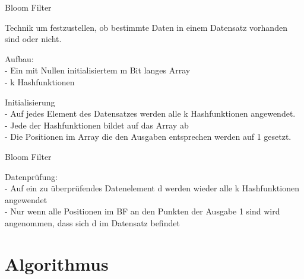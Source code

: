 \documentclass{beamer}
\begin{document}
	\begin{frame}{Bloom Filter}
		
		\begin{arrowlist}
			\item Technik um festzustellen, ob bestimmte Daten in einem Datensatz vorhanden sind oder nicht.
			\item  Aufbau:\\
			- Ein mit Nullen initialisiertem m Bit langes Array \\ 
			- k Hashfunktionen\\
			\item Initialisierung\\
			- Auf jedes Element des Datensatzes werden alle k Hashfunktionen angewendet.\\ 
			- Jede der Hashfunktionen bildet auf das Array ab\\
			- Die Positionen im Array die den Ausgaben entsprechen werden auf 1 gesetzt.\\
			
		\end{arrowlist}
		
	\end{frame}
	\begin{frame}{Bloom Filter}
		\begin{arrowlist}
			
			\item Datenprüfung:\\
			- Auf ein zu überprüfendes Datenelement d werden wieder alle k Hashfunktionen angewendet\\
			- Nur wenn alle Positionen im BF an den Punkten der Ausgabe 1 sind wird angenommen, dass sich d im Datensatz befindet
		\end{arrowlist}
		
	\end{frame}
	
	\section{Algorithmus}
	
\end{document}
